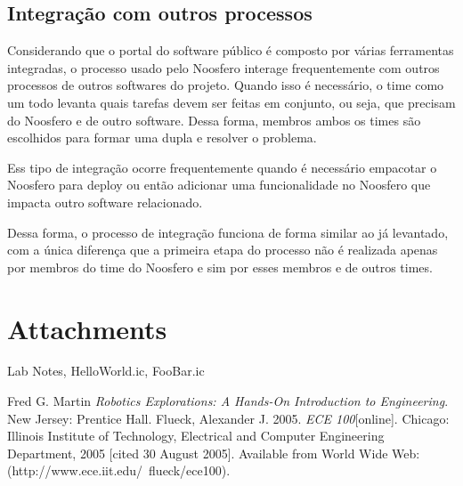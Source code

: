 \documentclass[a4paper, 11pt]{article}
\begin{document}
\subsection*{Integração com outros processos}

Considerando que o portal do software público é composto por várias ferramentas
integradas, o processo usado pelo Noosfero interage frequentemente com outros
processos de outros softwares do projeto. Quando isso é necessário, o time como
um todo levanta quais tarefas devem ser feitas em conjunto, ou seja, que
precisam do Noosfero e de outro software. Dessa forma, membros ambos os times
são escolhidos para formar uma dupla e resolver o problema.

Ess tipo de integração ocorre frequentemente quando é necessário empacotar o
Noosfero para deploy ou então adicionar uma funcionalidade no Noosfero que
impacta outro software relacionado.

Dessa forma, o processo de integração funciona de forma similar ao já levantado,
com a única diferença que a primeira etapa do processo não é realizada apenas
por membros do time do Noosfero e sim por esses membros e de outros times.

\section*{Attachments}
Lab Notes, HelloWorld.ic, FooBar.ic

\begin{thebibliography}{9}
 Fred G. Martin \emph{Robotics Explorations: A Hands-On
Introduction to Engineering}. New Jersey: Prentice Hall.
  Flueck, Alexander J. 2005. \emph{ECE 100}[online]. Chicago:
Illinois Institute of Technology, Electrical and Computer Engineering
Department, 2005 [cited 30
August 2005]. Available from World Wide Web:
(http://www.ece.iit.edu/~flueck/ece100).
\end{thebibliography}
\end{document}

